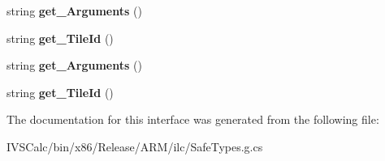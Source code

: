 \begin{DoxyCompactItemize}
string {\bfseries get\+\_\+\+Arguments} ()
\item 
\mbox{\label{interface_windows_1_1_application_model_1_1_activation_1_1_i_launch_activated_event_args_a523afb3676a6496e9992dbb3c6096c96}} 
string {\bfseries get\+\_\+\+Tile\+Id} ()
\item 
\mbox{\label{interface_windows_1_1_application_model_1_1_activation_1_1_i_launch_activated_event_args_ac58faf327ab9c709b2b6c168b50a39dc}} 
string {\bfseries get\+\_\+\+Arguments} ()
\item 
\mbox{\label{interface_windows_1_1_application_model_1_1_activation_1_1_i_launch_activated_event_args_a523afb3676a6496e9992dbb3c6096c96}} 
string {\bfseries get\+\_\+\+Tile\+Id} ()
\end{DoxyCompactItemize}


The documentation for this interface was generated from the following file\+:\begin{DoxyCompactItemize}
\item 
I\+V\+S\+Calc/bin/x86/\+Release/\+A\+R\+M/ilc/Safe\+Types.\+g.\+cs\end{DoxyCompactItemize}
